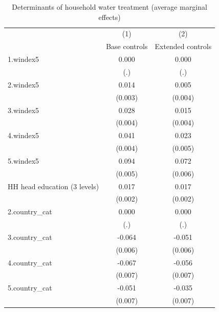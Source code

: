 \begin{table}[htbp]\centering
\caption{Determinants of household water treatment (average marginal effects)}
\begin{tabular}{l cc}
\toprule
            &\multicolumn{1}{c}{(1)}&\multicolumn{1}{c}{(2)}\\
            &\multicolumn{1}{c}{Base controls}&\multicolumn{1}{c}{Extended controls}\\

1.windex5   &       0.000         &       0.000         \\
            &         (.)         &         (.)         \\
\addlinespace
2.windex5   &       0.014\sym{***}&       0.005         \\
            &     (0.003)         &     (0.004)         \\
\addlinespace
3.windex5   &       0.028\sym{***}&       0.015\sym{***}\\
            &     (0.004)         &     (0.004)         \\
\addlinespace
4.windex5   &       0.041\sym{***}&       0.023\sym{***}\\
            &     (0.004)         &     (0.005)         \\
\addlinespace
5.windex5   &       0.094\sym{***}&       0.072\sym{***}\\
            &     (0.005)         &     (0.006)         \\
\addlinespace
HH head education (3 levels)&       0.017\sym{***}&       0.017\sym{***}\\
            &     (0.002)         &     (0.002)         \\
\addlinespace
2.country\_cat&       0.000         &       0.000         \\
            &         (.)         &         (.)         \\
\addlinespace
3.country\_cat&      -0.064\sym{***}&      -0.051\sym{***}\\
            &     (0.006)         &     (0.006)         \\
\addlinespace
4.country\_cat&      -0.067\sym{***}&      -0.056\sym{***}\\
            &     (0.007)         &     (0.007)         \\
\addlinespace
5.country\_cat&      -0.051\sym{***}&      -0.035\sym{***}\\
            &     (0.007)         &     (0.007)         \\

\end{tabular}
\end{table}
